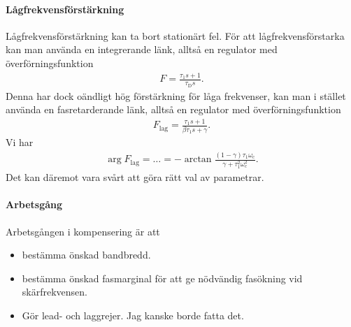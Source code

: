 \paragraph{Lågfrekvensförstärkning}
Lågfrekvensförstärkning kan ta bort stationärt fel. För att lågfrekvensförstarka kan man använda en integrerande länk, alltså en regulator med överförningsfunktion
\begin{align*}
	F = \frac{\tau_{1}s + 1}{\tau_{\text{D}}s}.
\end{align*}
Denna har dock oändligt hög förstärkning för låga frekvenser, kan man i stället använda en fasretarderande länk, alltså en regulator med överförningsfunktion
\begin{align*}
	F_{\text{lag}} = \frac{\tau_{1}s + 1}{\beta\tau_{1}s + \gamma}.
\end{align*}
Vi har
\begin{align*}
	\arg{F_{\text{lag}}} = \dots = -\arctan{\frac{(1 - \gamma)\tau_{1}\omega_{\text{c}}}{\gamma + \tau_{1}^{2}\omega_{\text{c}}^{2}}}.
\end{align*}
Det kan däremot vara svårt att göra rätt val av parametrar.

\paragraph{Arbetsgång}
Arbetsgången i kompensering är att
\begin{itemize}
	\item bestämma önskad bandbredd.
	\item bestämma önskad fasmarginal för att ge nödvändig fasökning vid skärfrekvensen.
	\item Gör lead- och laggrejer. Jag kanske borde fatta det.
\end{itemize}